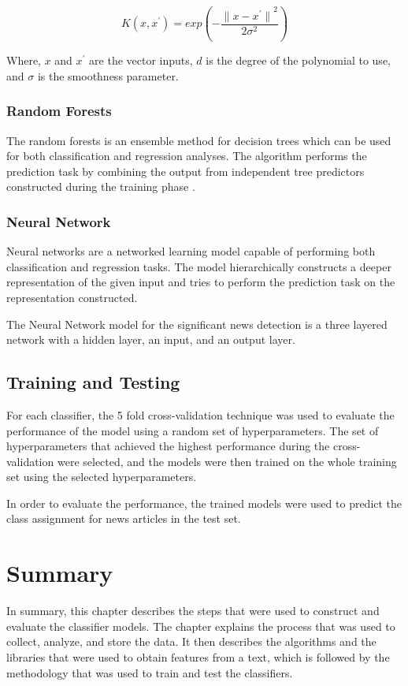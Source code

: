 \begin{equation}
    \label{eq:rbf_kernel}
    K(x, x^{'}) = exp(- \frac{{\lVert x - x^{'} \rVert}^{2}}{2 \sigma^{2}})
\end{equation}

\noindent
Where, $x$ and $x^{'}$ are the vector inputs, $d$ is the degree of the polynomial to use, and $\sigma$ is the smoothness parameter.

\subsubsection{Random Forests}
The random forests\cite{breiman2001random} is an ensemble method for decision trees\cite{quinlan1986induction} which can be used for both classification and regression analyses. The algorithm performs the prediction task by combining the output from independent tree predictors constructed during the training phase \cite{breiman2001random}. 

\subsubsection{Neural Network}
Neural networks are a networked learning model capable of performing both classification and regression tasks. The model hierarchically constructs a deeper representation of the given input and tries to perform the prediction task on the representation constructed. 

The Neural Network model for the significant news detection is a three layered network with a hidden layer, an input, and an output layer.

\subsection{Training and Testing}

For each classifier, the 5 fold cross-validation technique was used to evaluate the performance of the model using a random set of hyperparameters. The set of hyperparameters that achieved the highest performance during the cross-validation were selected, and the models were then trained on the whole training set using the selected hyperparameters.

In order to evaluate the performance, the trained models were used to predict the class assignment for news articles in the test set. 

\section{Summary}
In summary, this chapter describes the steps that were used to construct and evaluate the classifier models. The chapter explains the process that was used to collect, analyze, and store the data. It then describes the algorithms and the libraries that were used to obtain features from a text, which is followed by the methodology that was used to train and test the classifiers.